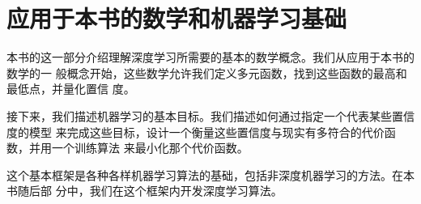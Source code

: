 
\part{应用于本书的数学和机器学习基础}
\label{part_basics}

本书的这一部分介绍理解深度学习所需要的基本的数学概念。我们从应用于本书的数学的一
般概念开始，这些数学允许我们定义多元函数，找到这些函数的最高和最低点，并量化置信
度。

接下来，我们描述机器学习的基本目标。我们描述如何通过指定一个代表某些置信度的模型
来完成这些目标，设计一个衡量这些置信度与现实有多符合的代价函数，并用一个训练算法
来最小化那个代价函数。

这个基本框架是各种各样机器学习算法的基础，包括非深度机器学习的方法。在本书随后部
分中，我们在这个框架内开发深度学习算法。
